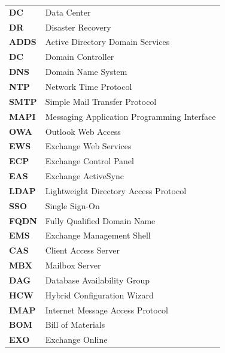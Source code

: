 \documentclass[reqno,12pt,oneside]{report} %
\theoremstyle{plain}
\theoremstyle{definition}
\theoremstyle{remark}
\numberwithin{theorem}{chapter}     %
\begin{document}
\begin{tabular}{p{2.5cm}p{10cm}}
\textbf{DC}  & Data Center\\
\textbf{DR}  & Disaster Recovery \\
\textbf{ADDS}  & Active Directory Domain Services \\
\textbf{DC}  & Domain Controller \\ 
\textbf{DNS}  & Domain Name System \\ 
\textbf{NTP}  & Network Time Protocol \\ 
\textbf{SMTP}  & Simple Mail Transfer Protocol \\ 
\textbf{MAPI}  & Messaging Application Programming Interface \\ 
\textbf{OWA}  & Outlook Web Access \\ 
\textbf{EWS}  & Exchange Web Services \\ 
\textbf{ECP}  & Exchange Control Panel \\ 
\textbf{EAS}  & Exchange ActiveSync \\ 
\textbf{LDAP}  & Lightweight Directory Access Protocol \\ 
\textbf{SSO}  & Single Sign-On \\ 
\textbf{FQDN}  & Fully Qualified Domain Name \\ 
\textbf{EMS}  & Exchange Management Shell \\ 
\textbf{CAS}  & Client Access Server \\ 
\textbf{MBX}  & Mailbox Server \\ 
\textbf{DAG}  & Database Availability Group \\ 
\textbf{HCW}  & Hybrid Configuration Wizard \\ 
\textbf{IMAP}  & Internet Message Access Protocol \\ 
\textbf{BOM}  & Bill of Materials \\ 
\textbf{EXO}  & Exchange Online \\ 

\end{tabular}




%
\listoffigures   %
\tableofcontents     %

\printnomenclature[1.5cm]

\end{document}
